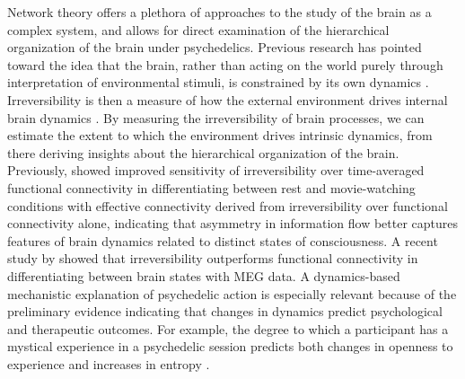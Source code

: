 Network theory offers a plethora of approaches to the study of the brain
as a complex system, and allows for direct examination of the
hierarchical organization of the brain under psychedelics. Previous
research has pointed toward the idea that the brain, rather than acting
on the world purely through interpretation of environmental stimuli, is
constrained by its own dynamics \parencite{Buzsaki2019}. Irreversibility is then
a measure of how the external environment drives internal brain dynamics \parencite{Buzsaki2019, Deco2022, Kringelbach2023}. By
measuring the irreversibility of brain processes, we can estimate the
extent to which the environment drives intrinsic dynamics, from there
deriving insights about the hierarchical organization of the brain.
Previously, \textcite{Kringelbach2023} showed improved sensitivity of
irreversibility over time-averaged functional connectivity in
differentiating between rest and movie-watching conditions with
effective connectivity derived from irreversibility over functional
connectivity alone, indicating that asymmetry in information flow better
captures features of brain dynamics related to distinct states of
consciousness. A recent study by \textcite{Tewarie2023} showed that
irreversibility outperforms functional connectivity in differentiating between brain states with MEG data. A dynamics-based mechanistic
explanation of psychedelic action is especially relevant because of the
preliminary evidence indicating that changes in dynamics predict
psychological and therapeutic outcomes. For example, the degree to which
a participant has a mystical experience in a psychedelic session
predicts both changes in openness to experience 
and increases in entropy \parencite{MacLean2011, Lebedev2016}.

